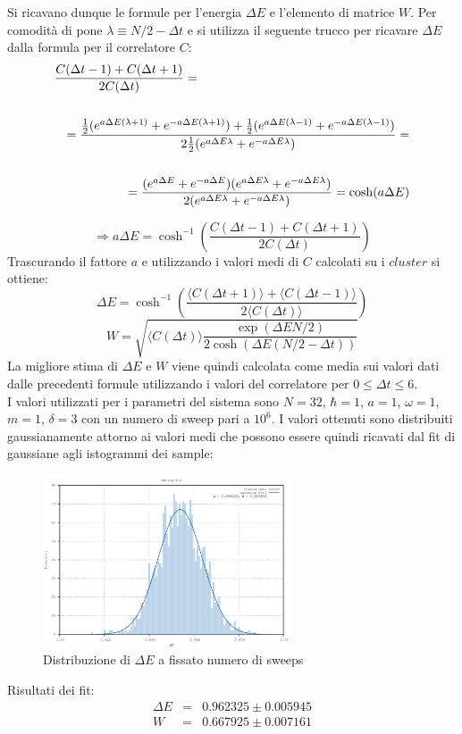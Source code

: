 Si ricavano dunque le formule per l'energia $\Delta E$ e l'elemento di matrice $W$. Per comodità di pone $\lambda\equiv N/2-\Delta t$ e si utilizza il seguente trucco per ricavare $\Delta E$ dalla formula per il correlatore $C$:
\begin{eqnarray*}
 \lefteqn{\frac{C(\Delta t-1)+C(\Delta t+1)}{2C(\Delta t)}=}\\
\\
   && =\frac{\tfrac{1}{2} (e^{a\Delta E(\lambda+1)}+e^{-a\Delta E(\lambda+1)})+\tfrac{1}{2} (e^{a\Delta E(\lambda-1)}+e^{-a\Delta E(\lambda-1)})}{2\tfrac{1}{2} (e^{a\Delta E\lambda}+e^{-a\Delta E\lambda})}=\\
\\
   && =\frac{(e^{a\Delta E}+e^{-a\Delta E})(e^{a\Delta E\lambda}+e^{-a\Delta E\lambda})}{2(e^{a\Delta E\lambda}+e^{-a\Delta E\lambda})}=\cosh(a\Delta E)
\end{eqnarray*}

$$\Rightarrow a\Delta E=\cosh^{-1}\left(\frac{C(\Delta t-1)+C(\Delta t+1)}{2C(\Delta t)}\right)$$
Trascurando il fattore $a$ e utilizzando i valori medi di $C$ calcolati su i $cluster$ si ottiene:
$$\Delta E = \cosh^{-1}\left(\frac{\langle C(\Delta t+1)\rangle+\langle C(\Delta t-1)\rangle}{2 \langle C(\Delta t)\rangle}\right)$$
$$W=\sqrt{\langle C(\Delta t)\rangle\frac{\exp\left(\Delta EN/2\right)}{2\cosh(\Delta E(N/2-\Delta t))}}$$
La migliore stima di $\Delta E$ e $W$ viene quindi calcolata come media sui valori dati dalle precedenti formule utilizzando i valori del correlatore per $0\le\Delta t\le6$.
\\

I valori utilizzati per i parametri del sistema sono $N=32$, $\hbar=1$, $a=1$, $\omega=1$, $m=1$, $\delta=3$ con un numero di sweep pari a $10^6$. I valori ottenuti sono distribuiti gaussianamente attorno ai valori medi che possono essere quindi ricavati dal fit di gaussiane agli istogrammi dei sample:
\begin{figure}[H]
\centering
\includegraphics[width=0.65\textwidth]{histogram}
\caption{Distribuzione di $\Delta E$ a fissato numero di sweeps}
\label{fig:histogram}
\end{figure}
Risultati dei fit:
\begin{eqnarray*}
\Delta E&=&0.962325\pm0.005945\\
W&=&0.667925\pm0.007161
\end{eqnarray*}

